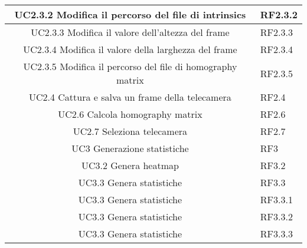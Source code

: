 \begin{center}
\begin{longtable}{ | c | p{1.5cm} |}
UC2.3.2 Modifica il percorso del file di intrinsics & RF2.3.2 \\ \hline 
UC2.3.3 Modifica il valore dell'altezza del frame & RF2.3.3 \\ \hline 
UC2.3.4 Modifica il valore della larghezza del frame & RF2.3.4 \\ \hline 
UC2.3.5 Modifica il percorso del file di homography matrix & RF2.3.5 \\ \hline 
UC2.4 Cattura e salva un frame della telecamera & RF2.4 \\ \hline 
UC2.6 Calcola homography matrix & RF2.6 \\ \hline 
UC2.7 Seleziona telecamera & RF2.7 \\ \hline 
UC3 Generazione statistiche & RF3 \\ \hline 
UC3.2 Genera heatmap & RF3.2 \\ \hline 
UC3.3 Genera statistiche & RF3.3 \\ \hline 
UC3.3 Genera statistiche & RF3.3.1 \\ \hline 
UC3.3 Genera statistiche & RF3.3.2 \\ \hline 
UC3.3 Genera statistiche & RF3.3.3 \\ \hline 
\end{longtable} 
\end{center} 